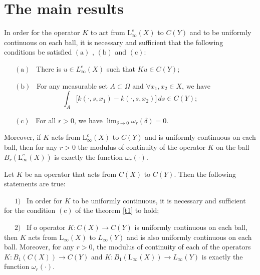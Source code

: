 \documentclass[12pt]{llncs}
\begin{document}
\section{The main results}

\begin{theorem} \label{t1} In order for the operator $K$ to act from $\mathrm{L}_\infty^c(X)$ to $C(Y)$ and to be uniformly continuous on each ball, it is necessary and sufficient that the following conditions be satisfied $\mathrm{(a)}$ , $\mathrm{(b)}$ and $\mathrm{(c)}$: \smallskip

\ \ \   $\mathrm{(a)}$ \ There is $u\in L_\infty^c(X)$ such that $Ku\in C(Y)$; 

 \ \ \  $\mathrm{(b)}$ \  For any measurable set $A\subset \Omega$ and $\forall x_1,x_2\in X$, we have $$\displaystyle \int_A \bigl[k(\cdot,s,x_1)-k(\cdot,s,x_2)\bigr]\,ds\in C(Y);$$

 \ \ \  $\mathrm{(c)}$ \  For all $r>0$, we have $\displaystyle \lim_{\delta\to 0}\omega_r(\delta)=0$. \smallskip

 Moreover, if $K$ acts from $\mathrm{L}_\infty^c(X)$ to $C(Y)$ and is uniformly continuous on each ball, then for any $r>0$ the modulus of continuity of the operator $K$ on the ball $B_r(\mathrm{L}_\infty^c(X))$ is exactly the function $\omega_r(\cdot)$.
\end{theorem}

\begin{theorem} \label{t2} Let $K$ be an operator that acts from $C(X)$ to $C(Y)$. Then the following statements are true:\smallskip 

\ \ \  $\mathrm{1)}$ \  In order for $K$ to be uniformly continuous, it is necessary and sufficient for the condition $\mathrm{(c)}$ of the theorem \ref{t1} to hold; \smallskip

\ \ \  $\mathrm{2)}$ \ If o operator $K: C(X) \to C(Y)$ is uniformly continuous on each ball, then $K$ acts from  $\mathrm{L}_\infty(X)$ to $L_\infty(Y)$ and is also uniformly continuous on each ball. Moreover, for any $r>0$, the modulus of continuity of each of the operators $K:B_1(C(X))\to C(Y)$ and $K:B_1(\mathrm{L}_\infty(X))\to L_\infty(Y)$ is exactly the function $\omega_r(\cdot)$.
\end{theorem}
\end{document}

